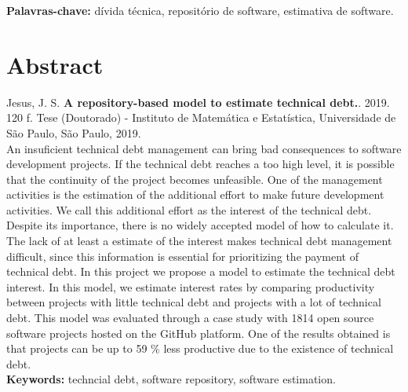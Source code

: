 \documentclass[11pt,twoside,a4paper]{book}
\begin{document}
\noindent \textbf{Palavras-chave:} dívida técnica, repositório de software, estimativa de software.

\chapter*{Abstract}
\noindent Jesus, J. S. \textbf{A repository-based model to estimate technical debt.}. 
2019. 120 f.
Tese (Doutorado) - Instituto de Matemática e Estatística,
Universidade de São Paulo, São Paulo, 2019.
\\
An insuficient technical debt management can bring bad consequences to software development projects. If the technical debt reaches a too high level, it is possible that the continuity of the project becomes unfeasible.
One of the management activities is the estimation of the additional effort  to make future development activities. We call this additional effort as the  interest of the technical debt. Despite its importance, there is no widely accepted model of how to calculate it. The lack of at least a estimate of the interest makes technical debt management difficult, since this information is essential for prioritizing the payment of technical debt.
 In this project we propose a model to estimate the technical debt interest. In this model, we estimate interest rates by comparing productivity between projects with little technical debt and projects with a lot of technical debt. This model was evaluated through a case study with 1814 open source software projects hosted on the GitHub platform. One of the results obtained is that projects can be up to 59 \% less productive due to the existence of technical debt.
\\

\noindent \textbf{Keywords:} techncial debt, software repository, software estimation.

\tableofcontents    %

         
\end{document}
